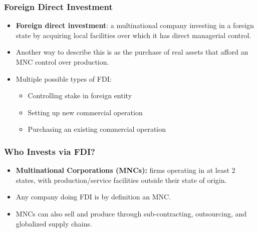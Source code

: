 \documentclass{beamer}
\begin{document}
\begin{frame} 
	\frametitle{\LARGE{Foreign Direct Investment}}
	\begin{itemize}
		\item \textbf{Foreign direct investment}: a multinational company investing in a foreign state by acquiring local facilities over which it has direct managerial control. \pause 
		\item Another way to describe this is as the purchase of real assets that afford an MNC control over production.
		\item Multiple possible types of FDI: 
		\begin{itemize}
			\item Controlling stake in foreign entity \pause 
			\item Setting up new commercial operation \pause 
			\item Purchasing an existing commercial operation  
		\end{itemize}
		
	\end{itemize}
\end{frame}

\begin{frame} 
	\frametitle{\LARGE{Who Invests via FDI?}}
	\begin{itemize}
		\item \textbf{Multinational Corporations (MNCs):} firms operating in at least 2 states, with production/service facilities outside their state of origin. \pause 
		\item Any company doing FDI is by definition an MNC. \pause 
		\item MNCs can also sell and produce through sub-contracting, outsourcing, and globalized supply chains. 
	\end{itemize}
\end{frame}
\end{document}
